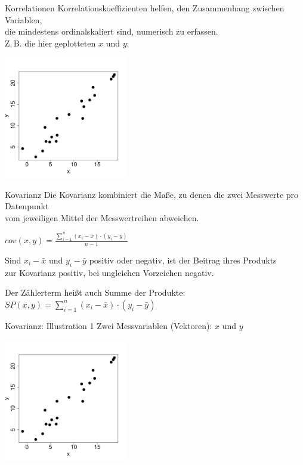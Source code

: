 \begin{frame}
  {Korrelationen}
  Korrelationskoeffizienten helfen, den Zusammenhang zwischen Variablen,\\
  die mindestens ordinalskaliert sind, numerisch zu erfassen.\\
  Z.\,B. die hier geplotteten $x$ und $y$:
  \vspace{-0.5cm}
  \begin{center}
    \includegraphics[width=0.4\textwidth]{graphics/corrplot}
  \end{center}
\end{frame}


\begin{frame}
  {Kovarianz}
  Die Kovarianz kombiniert die Maße, zu denen die \alert{zwei Messwerte} pro Datenpunkt\\
  vom \alert{jeweiligen Mittel der Messwertreihen} abweichen.\\
  \begin{center}
    \alert{$cov(x,y)=\frac{\sum\limits_{i=1}^{n}(x_i-\bar{x})\cdot(y_i-\bar{y})}{n-1}$}\\
  \end{center}
  \pause
  Sind $x_i-\bar{x}$ und $y_i-\bar{y}$ positiv oder negativ, ist der Beitrag ihres Produkts\\
  zur Kovarianz positiv, bei ungleichen Vorzeichen negativ.
  \pause
  \begin{center}
    Der Zählerterm heißt auch \alert{Summe der Produkte}:\\
    $SP(x,y)=\sum\limits_{i=1}^{n}(x_i-\bar{x})\cdot(y_i-\bar{y})$
  \end{center}
\end{frame}


\begin{frame}
  {Kovarianz: Illustration 1}
  Zwei Messvariablen (Vektoren): $x$ und $y$
  \begin{center}
    \includegraphics[width=0.4\textwidth]{graphics/cov01}
  \end{center}
\end{frame}


